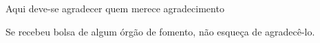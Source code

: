 
Aqui deve-se agradecer quem merece agradecimento

Se recebeu bolsa de algum órgão de fomento, não esqueça de agradecê-lo.
